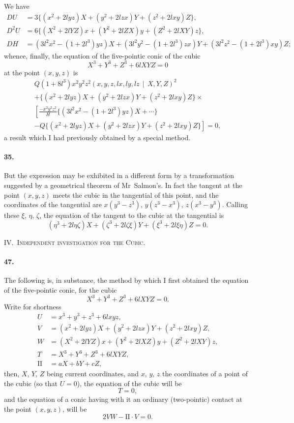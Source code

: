 \documentclass[12pt,a4paper]{article}
\theoremstyle{plain}
\begin{document}
We  have
\begin{align*}
DU &= 3\{(x^2 + 2lyz)X + (y^2 + 2lzx)Y + (z^2 + 2lxy)Z\}, \\
D^2 U &= 6\{(X^2 + 2lYZ)x + (Y^2 + 2lZX)y + (Z^2 + 2lXY)z\}, \\
DH &= (3l^2 x^2 - (1 + 2l^3)yz)X + (3l^2 y^2 - (1 + 2l^3)zx)Y + (3l^2 z^2 - (1 + 2l^3)xy)Z;
\end{align*}
whence,  finally,  the  equation  of  the  five-pointic  conic  of  the  cubic
\[
X^3 + Y^3 + Z^3 + 6lXYZ = 0
\]
at  the  point  $(x, y, z)$  is
\begin{multline*}
Q(1 + 8l^3) x^2 y^2 z^2 (x, y, z, lx, ly, lz \,\!\!\mid\, X, Y, Z)^2 \\
+ \{(x^2 + 2lyz)X + (y^2 + 2lzx)Y + (z^2 + 2lxy)Z\} \times \\
\left[\frac{-x^2 y^2 z^2}{H} \{(3l^2 x^2 - (1 + 2l^3)yz)X + \cdots\} \right. \\
\left. - Q\{(x^2 + 2lyz)X + (y^2 + 2lzx)Y + (z^2 + 2lxy)Z\}\right] = 0,
\end{multline*}
a  result  which  I  had  previously  obtained  by  a  special  method.

\paragraph{35.}
But  the  expression  may  be  exhibited  in  a  different  form  by  a  transformation
suggested  by  a  geometrical  theorem  of  Mr~Salmon's.  In  fact  the  tangent  at  the  point
$(x, y, z)$  meets  the  cubic  in  the  tangential  of  this  point,  and  the  coordinates  of  the
tangential  are  $x(y^3 - z^3)$,  $y(z^3 - x^3)$,  $z(x^3 - y^3)$.  Calling  these  $\xi$,  $\eta$,  $\zeta$,  the  equation  of
the  tangent  to  the  cubic  at  the  tangential  is
\[
(\eta^3 + 2l\eta\zeta)X + (\zeta^3 + 2l\zeta\xi)Y + (\xi^3 + 2l\xi\eta)Z = 0.
\]

\newpage
\noindent\textsc{IV.~Independent investigation for the Cubic.}

\medskip

\paragraph{47.}
The  following  is,  in  substance,  the  method  by  which  I  first  obtained  the
equation  of  the  five-pointic  conic,  for  the  cubic
\[
X^3 + Y^3 + Z^3 + 6lXYZ = 0.
\]
Write  for  shortness
\begin{align*}
U &= x^3 + y^3 + z^3 + 6lxyz, \\
V &= (x^2 + 2lyz)X + (y^2 + 2lzx)Y + (z^2 + 2lxy)Z, \\
W &= (X^2 + 2lYZ)x + (Y^2 + 2lXZ)y + (Z^2 + 2lXY)z, \\
T &= X^3 + Y^3 + Z^3 + 6lXYZ, \\
\mathrm{II} &= aX + bY + cZ,
\end{align*}
then,  $X$,  $Y$,  $Z$  being  current  coordinates,  and  $x$,  $y$,  $z$  the  coordinates  of  a  point  of
the  cubic  (so  that  $U = 0$),  the  equation  of  the  cubic  will  be
\[
T = 0,
\]
and  the  equation  of  a  conic  having  with  it  an  ordinary  (two-pointic)  contact  at  the
point  $(x, y, z)$,  will  be
\[
2VW - \mathrm{II} \cdot V = 0.
\]
\end{document}

